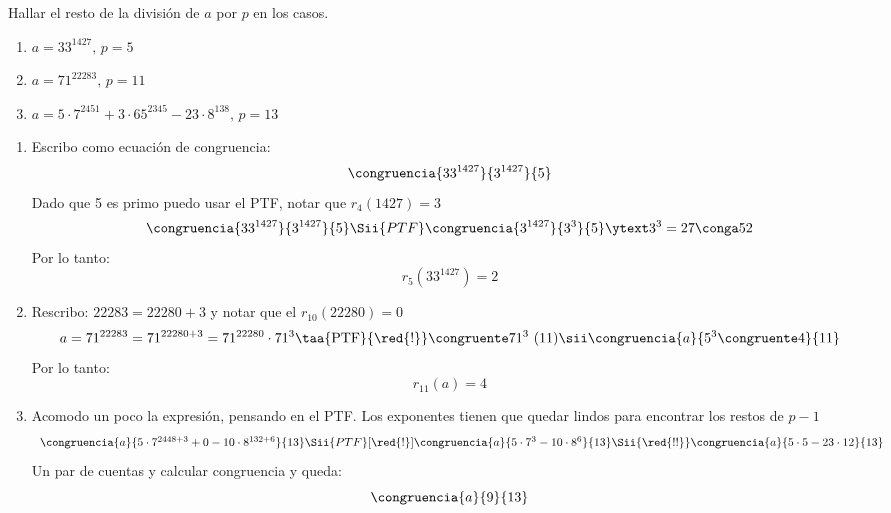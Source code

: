 \begin{enunciado}{\ejercicio}
  Hallar el resto de la división de $a$ por $p$ en los casos.
  \begin{enumerate}[label=\alph*)]
    \item $a = 33^{1427}, \, p =5$
    \item $a = 71^{22283},\, p=11$
    \item $a = 5 \cdot 7^{2451} + 3 \cdot 65^{2345} - 23 \cdot 8^{138}, \, p = 13$
  \end{enumerate}
\end{enunciado}

\begin{enumerate}[label=\alph*)]
  \item Escribo como ecuación de congruencia:
        $$
          \congruencia{33^{1427}}{3^{1427}}{5}
        $$
        Dado que 5 es primo puedo usar el PTF, notar que $r_4(1427) = 3 $
        $$
          \congruencia{33^{1427}}{3^{1427}}{5}
          \Sii{PTF}
          \congruencia{3^{1427}}{3^3}{5} \ytext 3^3 = 27 \conga5 2
        $$
        Por lo tanto:
        $$
          r_5(33^{1427}) = 2
        $$
  \item
        Rescribo: $22283 = 22280 + 3$ y notar que el $r_{10}(22280) = 0$
        $$
          a = 71^{22283} =
          71^{22280 + 3} =
          71^{22280} \cdot 71^3
          \taa{\text{PTF}}{\red{!}}\congruente 71^3 \ (11)
          \sii
          \congruencia{a}{5^3 \congruente 4}{11}
        $$
        Por lo tanto:
        $$
          r_{11}(a) = 4
        $$

  \item
        Acomodo un poco la expresión, pensando en el PTF. Los exponentes tienen que quedar lindos para encontrar los restos de $p-1$
        $$
          \begin{array}{l}
            \congruencia{a}{5 \cdot 7^{2448 + 3} + 0 - 10 \cdot 8^{132 + 6}}{13}
            \Sii{PTF}[\red{!}]
            \congruencia{a}{5 \cdot 7^3 - 10 \cdot 8^6}{13}
            \Sii{\red{!!}}
            \congruencia{a}{5 \cdot 5 - 23 \cdot 12}{13}
          \end{array}
        $$
        Un par de cuentas y calcular congruencia y queda:
        $$
          \congruencia{a}{9}{13}
        $$
\end{enumerate}

\begin{aportes}
  \item {}
\end{aportes}
